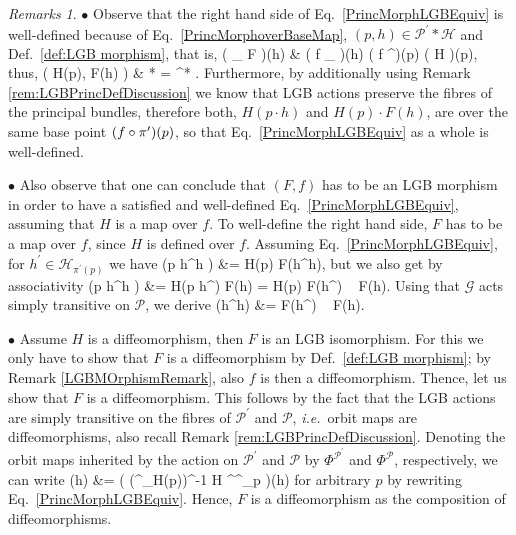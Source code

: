 \documentclass[a4paper,oneside,11pt,bibliography=totoc]{scrartcl}
\def\bas#1\eas{\begin{align*}#1\end{align*}}
\theoremstyle{plain}
\theoremstyle{remark}
\newtheorem{remark}[theorem]{Remarks}
\theoremstyle{definition}
\begin{document}
\begin{remark}
\leavevmode\newline
\indent $\bullet$ Observe that the right hand side of Eq.\ \eqref{PrincMorphLGBEquiv} is well-defined because of Eq.\ \eqref{PrincMorphoverBaseMap}, $(p, h) \in \mathcal{P}^\prime * \mathcal{H}$ and Def.\ \ref{def:LGB morphism}, that is,
\bas
\mleft( \pi_{} \circ F \mright)(h)
&\stackrel{\text{\ref{def:LGB morphism}}}{=}
\mleft( f \circ \pi_{} \mright)(h)
\mleft( f \circ \pi^\prime \mright)(p)
\stackrel{\eqref{PrincMorphoverBaseMap}}{=}
\mleft( \pi \circ H \mright)(p),
\eas
thus,
\bas
\bigl( H(p), F(h) \bigr)
&\in
{} * 
=
\pi^* .
\eas
Furthermore, by additionally using Remark \ref{rem:LGBPrincDefDiscussion} we know that LGB actions preserve the fibres of the principal bundles, therefore both, $H(p \cdot h)$ and $H(p) \cdot F(h)$, are over the same base point $\mleft(f \circ \pi^\prime\mright)(p)$, so that Eq.\ \eqref{PrincMorphLGBEquiv} as a whole is well-defined.

$\bullet$ Also observe that one can conclude that $(F,f)$ has to be an LGB morphism in order to have a satisfied and well-defined Eq.\ \eqref{PrincMorphLGBEquiv}, assuming that $H$ is a map over $f$. To well-define the right hand side, $F$ has to be a map over $f$, since $H$ is defined over $f$. Assuming Eq.\ \eqref{PrincMorphLGBEquiv}, for $h^\prime \in \mathcal{H}_{\pi^\prime(p)}$ we have
\bas
H\mleft(p \cdot h^\prime h \mright)
&=
H(p) \cdot F\mleft(h^\prime h\mright),
\eas
but we also get by associativity
\bas
H\mleft(p \cdot h^\prime h \mright)
&=
H\mleft(p \cdot h^\prime \mright) \cdot F(h)
=
H(p) \cdot F\mleft(h^\prime\mright) ~ F(h).
\eas
Using that $\mathcal{G}$ acts simply transitive on $\mathcal{P}$, we derive
\bas
F\mleft(h^\prime h\mright)
&=
F\mleft(h^\prime\mright) ~ F(h).
\eas

$\bullet$ Assume $H$ is a diffeomorphism, then $F$ is an LGB isomorphism. For this we only have to show that $F$ is a diffeomorphism by Def.\ \ref{def:LGB morphism}; by Remark \ref{LGBMOrphismRemark}, also $f$ is then a diffeomorphism. Thence, let us show that $F$ is a diffeomorphism. This follows by the fact that the LGB actions are simply transitive on the fibres of $\mathcal{P}^\prime$ and $\mathcal{P}$, \textit{i.e.}\ orbit maps are diffeomorphisms, also recall Remark \ref{rem:LGBPrincDefDiscussion}. Denoting the orbit maps inherited by the action on $\mathcal{P}^\prime$ and $\mathcal{P}$ by $\Phi^{\mathcal{P}^\prime}$ and $\Phi^{\mathcal{P}}$, respectively, we can write
\bas
F(h)
&=
\mleft(
	\mleft(\Phi^{}_{H(p)}\mright)^{-1} \circ H \circ \Phi^{^\prime}_p 
\mright)(h)
\eas
for arbitrary $p$ by rewriting Eq.\ \eqref{PrincMorphLGBEquiv}. Hence, $F$ is a diffeomorphism as the composition of diffeomorphisms.


\end{remark}
\end{document}
